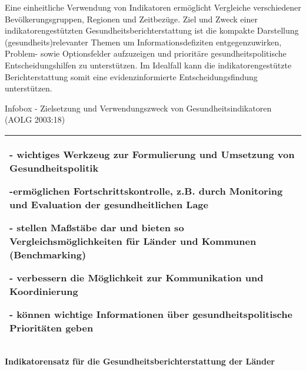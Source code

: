 \documentclass{article}
\begin{document}
Eine einheitliche Verwendung von Indikatoren ermöglicht Vergleiche verschiedener Bevölkerungsgruppen, Regionen und Zeitbezüge. Ziel und Zweck einer indikatorengestützten Gesundheitsberichterstattung ist die kompakte Darstellung (gesundheits)relevanter Themen um Informationsdefiziten entgegenzuwirken, Problem- sowie Optionsfelder aufzuzeigen und prioritäre gesundheitspolitische Entscheidungshilfen zu unterstützen. Im Idealfall kann die indikatorengestützte Berichterstattung somit eine evidenzinformierte Entscheidungsfindung unterstützen. 


Infobox - Zielsetzung und Verwendungszweck von Gesundheitsindikatoren (AOLG 2003:18)


\begin{tabu} to \textwidth { |X| }
\hline



- wichtiges Werkzeug zur Formulierung und Umsetzung von \textbf{Gesundheitspolitik}

\textbf{-}ermöglichen \textbf{Fortschrittskontrolle}, z.B. durch Monitoring und Evaluation der gesundheitlichen Lage

- stellen \textbf{Maßstäbe} dar und bieten so \textbf{Vergleichsmöglichkeiten} für Länder und Kommunen (Benchmarking)

- verbessern die Möglichkeit zur \textbf{Kommunikation} und \textbf{Koordinierung}

\textbf{- }können wichtige Informationen über \textbf{gesundheitspolitische Prioritäten }geben
 \\
\hline

\end{tabu}




\textbf{Indikatorensatz für die Gesundheitsberichterstattung der Länder }
\end{document}
